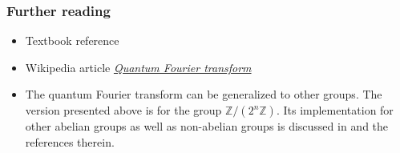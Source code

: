 \begin{refsection}

\subsubsection*{Further reading}

\begin{itemize}
    \item Textbook reference \cite[Chapter 5]{nielsen2002QCQI}
    \item Wikipedia article \hyperlink{https://en.wikipedia.org/wiki/Quantum_Fourier_transform}{\it Quantum Fourier transform}
    \item The quantum Fourier transform can be generalized to other groups. The version presented above is for the group $\mathbb{Z}/(2^n\mathbb{Z})$. Its implementation for other abelian groups as well as non-abelian groups is discussed in \cite{childs2010QAlgosForAlgebraicProblems} and the references therein. 
\end{itemize}
\printbibliography[heading=secbib,segment=\therefsegment]

\end{refsection}
